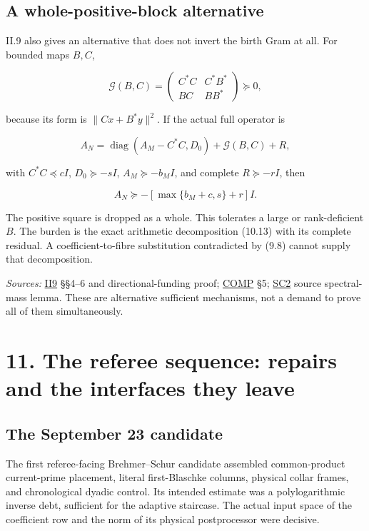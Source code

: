 \documentclass[
  10pt,
  a4paper,
  10pt,
  oneside,
  openany]{book}
\begin{document}
\subsection{A whole-positive-block
alternative}\label{a-whole-positive-block-alternative}

II.9 also gives an alternative that does not invert the birth Gram at
all. For bounded maps \(B,C\),

\[
\mathcal G(B,C)=
\begin{pmatrix}C^*C&C^*B^*\\BC&BB^*\end{pmatrix}\succeq0,
\tag{10.12}\label{eq:10.12}
\]

because its form is \(\|Cx+B^*y\|^2\). If the actual full operator is

\[
A_N=\operatorname{diag}(A_M-C^*C,D_0)+\mathcal G(B,C)+R,
\tag{10.13}\label{eq:10.13}
\]

with \(C^*C\preceq cI\), \(D_0\succeq-sI\), \(A_M\succeq-b_MI\), and
complete \(R\succeq-rI\), then

\[
A_N\succeq-[\max\{b_M+c,s\}+r]I.
\tag{10.14}\label{eq:10.14}
\]

The positive square is dropped as a whole. This tolerates a large or
rank-deficient \(B\). The burden is the exact arithmetic decomposition
(10.13) with its complete residual. A coefficient-to-fibre substitution
contradicted by (9.8) cannot supply that decomposition.

\emph{Sources:} \hyperref[source-ii9]{II9} §§4--6 and
directional-funding proof; \hyperref[source-comp]{COMP} §5;
\hyperref[source-sc2]{SC2} source spectral-mass lemma. These are
alternative sufficient mechanisms, not a demand to prove all of them
simultaneously.

\section{11. The referee sequence: repairs and the interfaces they
leave}\label{ch-referee-history}

\subsection{The September 23
candidate}\label{the-september-23-candidate}

The first referee-facing Brehmer--Schur candidate assembled
common-product current-prime placement, literal first-Blaschke columns,
physical collar frames, and chronological dyadic control. Its intended
estimate was a polylogarithmic inverse debt, sufficient for the adaptive
staircase. The actual input space of the coefficient row and the norm of
its physical postprocessor were decisive.
\end{document}
